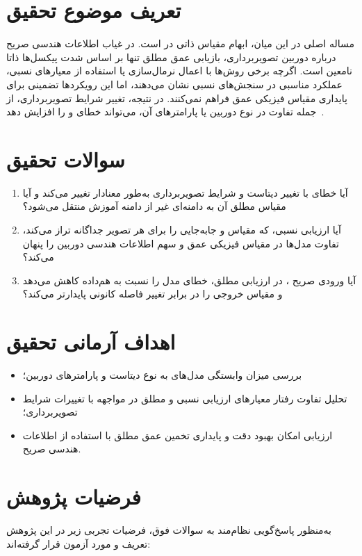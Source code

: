 \section{تعریف موضوع تحقیق}
مساله اصلی در این میان، ابهام مقیاس ذاتی در  است.
در غیاب اطلاعات هندسی صریح درباره دوربین تصویربرداری،
بازیابی عمق مطلق تنها بر اساس شدت پیکسل‌ها ذاتا نامعین است. اگرچه برخی روش‌ها با اعمال نرمال‌سازی یا استفاده از معیارهای نسبی، عملکرد مناسبی در سنجش‌های نسبی نشان می‌دهند، اما این رویکردها تضمینی برای پایداری مقیاس فیزیکی عمق فراهم نمی‌کنند. در نتیجه، تغییر شرایط تصویربرداری، از جمله تفاوت در نوع دوربین یا پارامترهای آن، می‌تواند خطای  و  را افزایش دهد~\cite{HartleyZisserman2004}.

\section{سوالات تحقیق}
\label{sec:research_questions_ch1}
\begin{enumerate}
	\item
	آیا خطای \basemodel{} با تغییر دیتاست و شرایط تصویربرداری به‌طور معنادار تغییر می‌کند و آیا مقیاس مطلق آن به دامنه‌ای غیر از دامنه آموزش منتقل می‌شود؟
	\item
	آیا ارزیابی نسبی، که مقیاس و جابه‌جایی را برای هر تصویر جداگانه تراز می‌کند، تفاوت مدل‌ها در مقیاس فیزیکی عمق و سهم اطلاعات هندسی دوربین را پنهان می‌کند؟
	\item
	آیا ورودی صریح \calibrationmatrix{}، در ارزیابی مطلق، خطای مدل را نسبت به \controlmodel{} هم‌داده کاهش می‌دهد و مقیاس خروجی را در برابر تغییر فاصله کانونی پایدارتر می‌کند؟
\end{enumerate}


\section{اهداف آرمانی تحقیق}
\begin{itemize}
	\item
	بررسی میزان وابستگی مدل‌های  به نوع دیتاست و پارامترهای دوربین؛
	\item
	تحلیل تفاوت رفتار معیارهای ارزیابی نسبی و مطلق در مواجهه با تغییرات شرایط تصویربرداری؛
	\item
	ارزیابی امکان بهبود دقت و پایداری تخمین عمق مطلق با استفاده از اطلاعات هندسی صریح.
\end{itemize}

\section{فرضیات پژوهش}
\label{sec:research_hypotheses}
به‌منظور پاسخ‌گویی نظام‌مند به سوالات فوق،
فرضیات تجربی زیر در این پژوهش تعریف و مورد آزمون قرار گرفته‌اند:

